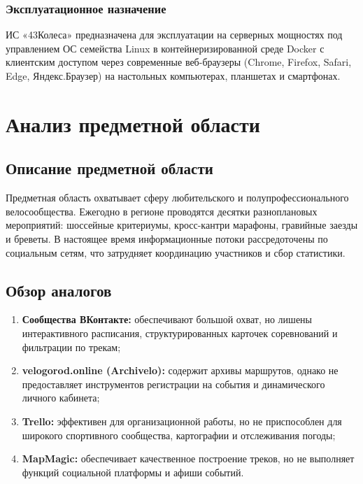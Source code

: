 \documentclass[a4paper,12pt]{article}
\begin{document}
\subsubsection{Эксплуатационное назначение}
ИС «43Колеса» предназначена для эксплуатации на серверных мощностях под управлением ОС семейства Linux в контейнеризированной среде Docker с клиентским доступом через современные веб-браузеры (Chrome, Firefox, Safari, Edge, Яндекс.Браузер) на настольных компьютерах, планшетах и смартфонах.

\section{Анализ предметной области}

\subsection{Описание предметной области}
Предметная область охватывает сферу любительского и полупрофессионального велосообщества. Ежегодно в регионе проводятся десятки разноплановых мероприятий: шоссейные критериумы, кросс-кантри марафоны, гравийные заезды и бреветы. В настоящее время информационные потоки рассредоточены по социальным сетям, что затрудняет координацию участников и сбор статистики.

\subsection{Обзор аналогов}
\begin{enumerate}
	\item \textbf{Сообщества ВКонтакте:} обеспечивают большой охват, но лишены интерактивного расписания, структурированных карточек соревнований и фильтрации по трекам;
	\item \textbf{velogorod.online (Archivelo):} содержит архивы маршрутов, однако не предоставляет инструментов регистрации на события и динамического личного кабинета;
	\item \textbf{Trello:} эффективен для организационной работы, но не приспособлен для широкого спортивного сообщества, картографии и отслеживания погоды;
	\item \textbf{MapMagic:} обеспечивает качественное построение треков, но не выполняет функций социальной платформы и афиши событий.
\end{enumerate}
\end{document}
